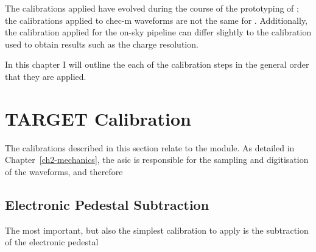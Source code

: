 The calibrations applied have evolved during the course of the prototyping of ; the calibrations applied to \gls{chec-m} waveforms are not the same for . Additionally, the calibration applied for the on-sky pipeline can differ slightly to the calibration used to obtain results such as the charge resolution.

In this chapter I will outline the each of the calibration steps in the general order that they are applied.


\section{TARGET Calibration}

The calibrations described in this section relate to the  module. As detailed in Chapter~\ref{ch2-mechanics}, the  \gls{asic} is responsible for the sampling and digitisation of the waveforms, and therefore 

\subsection{Electronic Pedestal Subtraction}

The most important, but also the simplest calibration to apply is the subtraction of the electronic pedestal
